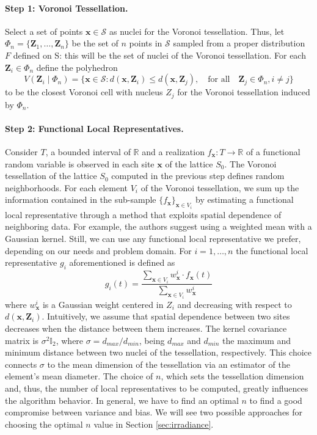 \paragraph{Step 1: Voronoi Tessellation.} Select a set of points $\mathbf{x}\in\mathcal{S}$ as nuclei for the Voronoi tessellation. Thus, let $\Phi_n=\{\mathbf{Z}_1, \dots, \mathbf{Z}_n\}$ be the set of $n$ points in $\mathcal{S}$ sampled from a proper distribution $F$ defined on S: this will be the set of nuclei of the Voronoi tessellation. For each $\mathbf{Z}_i\in\Phi_n$ define the polyhedron
\begin{equation}
    \label{eq:polyedron}
    V\left(\mathbf{Z}_i \mid \Phi_n\right)=\{\mathbf{x}\in\mathcal{S} : d\left(\mathbf{x},\mathbf{Z}_i\right) \leq d\left(\mathbf{x}, \mathbf{Z}_j\right), \quad \text{for all}\quad \mathbf{Z}_j \in \Phi_n, i\neq j\}
\end{equation}
to be the closest Voronoi cell with nucleus $Z_j$ for the Voronoi tessellation induced by $\Phi_n$.
\paragraph{Step 2: Functional Local Representatives.} Consider $T$, a bounded interval of $\mathbb{R}$ and a realization $f_{\mathbf{x}}:T\rightarrow \mathbb{R}$ of a functional random variable is observed in each site $\mathbf{x}$ of the lattice $S_0$. The Voronoi tessellation of the lattice $S_0$ computed in the previous step defines random neighborhoods. For each element $V_i$ of the Voronoi tessellation, we sum up the information contained in the sub-sample $\{f_{\mathbf{x}}\}_{\mathbf{x} \in V_i}$ by estimating a functional local representative through a method that exploits spatial dependence of neighboring data. For example, the authors suggest using a weighted mean with a Gaussian kernel. Still, we can use any functional local representative we prefer, depending on our needs and problem domain. For $i=1, \dots, n$ the functional local representative $g_i$ aforementioned is defined as
\begin{equation}
    \label{eq:gaussianmean}
    g_i(t)=\frac{\sum_{\mathbf{x}\in V_i}w^i_{\mathbf{x}}\cdot f_{\mathbf{x}}(t)}{\sum_{\mathbf{x}\in V_i}w^i_{\mathbf{x}}}
\end{equation}
where $w_{\mathbf{x}}^i$ is a Gaussian weight centered in $Z_i$ and decreasing with respect to $d\left(\mathbf{x}, \mathbf{Z}_i\right)$. Intuitively, we assume that spatial dependence between two sites decreases when the distance between them increases. The kernel covariance matrix is $\sigma^2\mathbb{I}_2$, where $\sigma=d_{max}/d_{min}$, being $d_{max}$ and $d_{min}$ the maximum and minimum distance between two nuclei of the tessellation, respectively. This choice connects $\sigma$ to the mean dimension of the tessellation via an estimator of the element's mean diameter. The choice of $n$, which sets the tessellation dimension and, thus, the number of local representatives to be computed, greatly influences the algorithm behavior. In general, we have to find an optimal $n$ to find a good compromise between variance and bias. We will see two possible approaches for choosing the optimal $n$ value in Section \ref{sec:irradiance}.
